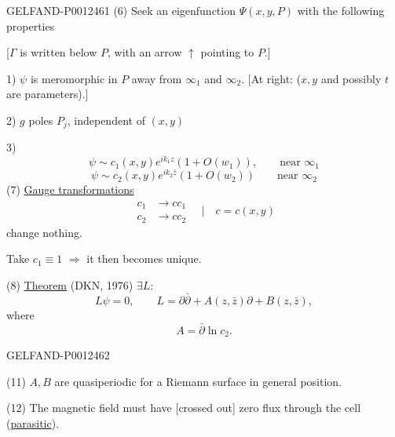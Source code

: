 \begin{GelfandAdjacentEvidence}{GELFAND-P001246}{1}
(6) Seek an eigenfunction $\Psi(x,y,P)$ with the following properties

[$\Gamma$ is written below $P$, with an arrow $\uparrow$ pointing to $P$.]

1) $\psi$ is meromorphic in $P$ away from $\infty_1$ and $\infty_2$.
[At right: ($x,y$ and possibly $t$ are parameters).]

2) $g$ poles $P_j$, independent of $(x,y)$

3)
\begin{equation*}
\psi\sim c_1(x,y)e^{ik_1z}(1+O(w_1)),\qquad\text{near }\infty_1
\end{equation*}
\begin{equation*}
\psi\sim c_2(x,y)e^{ik_2\bar z}(1+O(w_2))\qquad\text{near }\infty_2
\end{equation*}
(7) \underline{Gauge transformations}
\begin{equation*}
\begin{aligned}
c_1&\to cc_1\\
c_2&\to cc_2
\end{aligned}
\quad\bigg|\quad c=c(x,y)
\end{equation*}
change nothing.

Take $c_1\equiv1$ $\Rightarrow$ it then becomes unique.

(8) \underline{Theorem} (DKN, 1976) $\exists L$:
\begin{equation*}
L\psi=0,\qquad L=\partial\bar\partial+A(z,\bar z)\partial+B(z,\bar z),\tag{9}
\end{equation*}
where
\begin{equation*}
A=\bar\partial\ln c_2.\tag{10}
\end{equation*}
\end{GelfandAdjacentEvidence}
\begin{GelfandAdjacentEvidence}{GELFAND-P001246}{2}


(11) $A,B$ are quasiperiodic for a Riemann surface in general position.

(12) The magnetic field must have [crossed out] zero flux through the cell (\underline{parasitic}).
\end{GelfandAdjacentEvidence}
